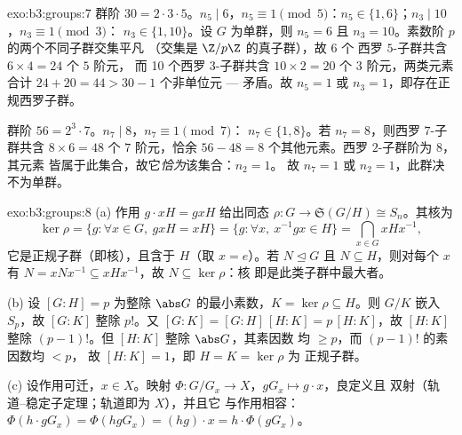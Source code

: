 \begin{solution}{exo:b3:groups:7}
群阶 $30 = 2 \cdot 3 \cdot 5$。$n_5 \mid 6$，$n_5 \equiv 1 \pmod
5$：$n_5 \in \{1, 6\}$；$n_3 \mid 10$，$n_3 \equiv 1 \pmod 3$：
$n_3 \in \{1, 10\}$。设 $G$ 为单群，则 $n_5 = 6$ 且 $n_3 =
10$。素数阶 $p$ 的两个不同子群交集平凡
（交集是 $\Z/p\Z$ 的真子群），故 6 个
西罗 $5$-子群共含 $6 \times 4 = 24$ 个 $5$ 阶元，
而 10 个西罗 $3$-子群共含 $10 \times 2 = 20$ 个
$3$ 阶元，两类元素合计 $24 + 20 = 44 > 30 - 1$ 个非单位元 ---
矛盾。故 $n_5 = 1$ 或 $n_3 = 1$，即存在正规西罗子群。

群阶 $56 = 2^3 \cdot 7$。$n_7 \mid 8$，$n_7 \equiv 1 \pmod 7$：
$n_7 \in \{1, 8\}$。若 $n_7 = 8$，则西罗 $7$-子群共含 $8
\times 6 = 48$ 个 $7$ 阶元，恰余 $56 - 48 =
8$ 个其他元素。西罗 $2$-子群阶为 $8$，其元素
皆属于此集合，故它\emph{恰为}该集合：$n_2 = 1$。
故 $n_7 = 1$ 或 $n_2 = 1$，此群决不为单群。
\end{solution}

\begin{solution}{exo:b3:groups:8}
(a) 作用 $g \cdot xH = gxH$ 给出同态 $\rho \colon G
\to \mathfrak S(G/H) \cong S_n$。其核为
\[
\ker\rho = \{g : \forall x \in G,\ gxH = xH\}
= \{g : \forall x,\ x^{-1}gx \in H\}
= \bigcap_{x \in G} xHx^{-1},
\]
它是正规子群（即核），且含于 $H$（取 $x = e$）。若
$N \trianglelefteq G$ 且 $N \subseteq H$，则对每个 $x$ 有 $N
= xNx^{-1} \subseteq xHx^{-1}$，故 $N \subseteq \ker\rho$：核
即是此类子群中最大者。

(b) 设 $[G:H] = p$ 为整除 $\abs G$ 的最小素数，$K =
\ker\rho \subseteq H$。则 $G/K$ 嵌入 $S_p$，故 $[G:K]$
整除 $p!$。又 $[G:K] = [G:H]\,[H:K] = p\,[H:K]$，故 $[H:K]$
整除 $(p-1)!$。但 $[H:K]$ 整除 $\abs G$，其素因数
均 $\geq p$，而 $(p-1)!$ 的素因数均 $< p$，
故 $[H:K] = 1$，即 $H = K = \ker \rho$ 为
正规子群。

(c) 设作用可迁，$x \in X$。映射 $\Phi
\colon G/G_x \to X$，$gG_x \mapsto g \cdot x$，良定义且
双射（轨道--稳定子定理；轨道即为 $X$），并且它
与作用相容：$\Phi(h \cdot gG_x) = \Phi(hgG_x) = (hg)
\cdot x = h \cdot \Phi(gG_x)$。
\end{solution}


